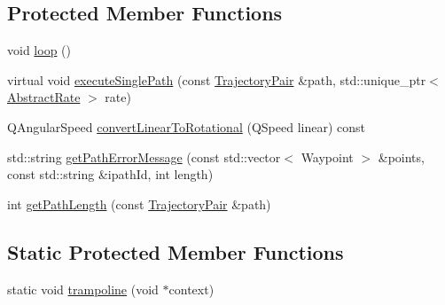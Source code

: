 \subsection*{Protected Member Functions}
\begin{DoxyCompactItemize}
\item 
void \mbox{\hyperlink{classokapi_1_1AsyncLinearMotionProfileController_aee386f2d2697feff54005cf9e91a6e52}{loop}} ()
\item 
virtual void \mbox{\hyperlink{classokapi_1_1AsyncLinearMotionProfileController_ac9f7d18503d72627ff4b7f70d2c373bd}{execute\+Single\+Path}} (const \mbox{\hyperlink{structokapi_1_1AsyncLinearMotionProfileController_1_1TrajectoryPair}{Trajectory\+Pair}} \&path, std\+::unique\+\_\+ptr$<$ \mbox{\hyperlink{classokapi_1_1AbstractRate}{Abstract\+Rate}} $>$ rate)
\item 
Q\+Angular\+Speed \mbox{\hyperlink{classokapi_1_1AsyncLinearMotionProfileController_a3b2473f949bab83f6837b8d448b198cb}{convert\+Linear\+To\+Rotational}} (Q\+Speed linear) const
\item 
std\+::string \mbox{\hyperlink{classokapi_1_1AsyncLinearMotionProfileController_a6778fc13018167cec6cccfa6abf7a0ad}{get\+Path\+Error\+Message}} (const std\+::vector$<$ Waypoint $>$ \&points, const std\+::string \&ipath\+Id, int length)
\item 
int \mbox{\hyperlink{classokapi_1_1AsyncLinearMotionProfileController_aede6dc18c7d2c8f5014c4ad6cd91d85d}{get\+Path\+Length}} (const \mbox{\hyperlink{structokapi_1_1AsyncLinearMotionProfileController_1_1TrajectoryPair}{Trajectory\+Pair}} \&path)
\end{DoxyCompactItemize}
\subsection*{Static Protected Member Functions}
\begin{DoxyCompactItemize}
\item 
static void \mbox{\hyperlink{classokapi_1_1AsyncLinearMotionProfileController_a9b49662a9d4107ebe1b4799934e472a3}{trampoline}} (void $\ast$context)
\end{DoxyCompactItemize}
